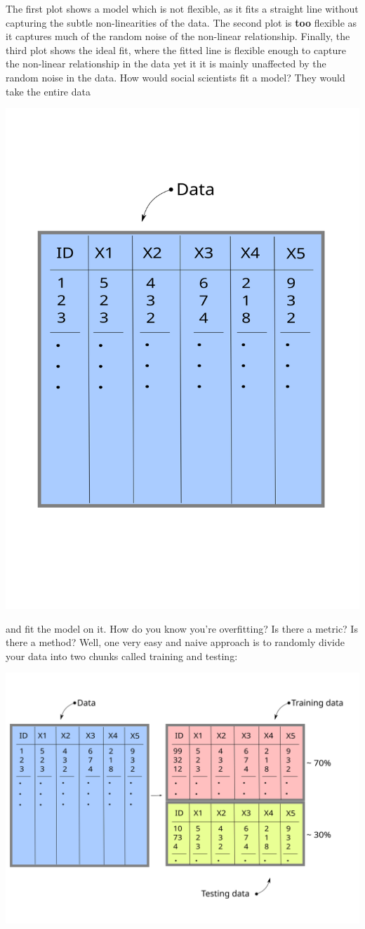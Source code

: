 \documentclass[
]{book}
\begin{document}
The first plot shows a model which is not flexible, as it fits a straight line without capturing the subtle non-linearities of the data. The second plot is \textbf{too} flexible as it captures much of the random noise of the non-linear relationship. Finally, the third plot shows the ideal fit, where the fitted line is flexible enough to capture the non-linear relationship in the data yet it it is mainly unaffected by the random noise in the data. How would social scientists fit a model? They would take the entire data

\begin{center}\includegraphics[width=0.4\linewidth]{./img/raw_data_wnote} \end{center}

and fit the model on it. How do you know you're overfitting? Is there a metric? Is there a method? Well, one very easy and naive approach is to randomly divide your data into two chunks called training and testing:

\begin{center}\includegraphics[width=0.8\linewidth]{./img/train_testing_df} \end{center}
\end{document}
